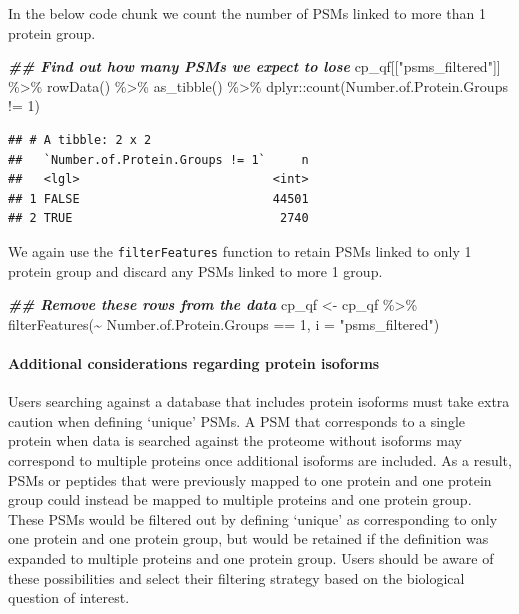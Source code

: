 \documentclass[9pt,a4paper,]{extarticle}
\newenvironment{Shaded}{\begin{snugshade}}{\end{snugshade}}
\newcommand{\AttributeTok}[1]{\textcolor[rgb]{0.77,0.63,0.00}{#1}}
\newcommand{\DecValTok}[1]{\textcolor[rgb]{0.00,0.00,0.81}{#1}}
\newcommand{\DocumentationTok}[1]{\textcolor[rgb]{0.56,0.35,0.01}{\textbf{\textit{#1}}}}
\newcommand{\FunctionTok}[1]{\textcolor[rgb]{0.00,0.00,0.00}{#1}}
\newcommand{\NormalTok}[1]{#1}
\newcommand{\OtherTok}[1]{\textcolor[rgb]{0.56,0.35,0.01}{#1}}
\newcommand{\SpecialCharTok}[1]{\textcolor[rgb]{0.00,0.00,0.00}{#1}}
\newcommand{\StringTok}[1]{\textcolor[rgb]{0.31,0.60,0.02}{#1}}
\begin{document}
In the below code chunk we count the number of PSMs linked to more than 1
protein group.

\begin{Shaded}
\begin{Highlighting}[]
\DocumentationTok{\#\# Find out how many PSMs we expect to lose}
\NormalTok{cp\_qf[[}\StringTok{"psms\_filtered"}\NormalTok{]] }\SpecialCharTok{\%\textgreater{}\%} 
  \FunctionTok{rowData}\NormalTok{() }\SpecialCharTok{\%\textgreater{}\%} 
  \FunctionTok{as\_tibble}\NormalTok{() }\SpecialCharTok{\%\textgreater{}\%} 
\NormalTok{  dplyr}\SpecialCharTok{::}\FunctionTok{count}\NormalTok{(Number.of.Protein.Groups }\SpecialCharTok{!=} \DecValTok{1}\NormalTok{)}
\end{Highlighting}
\end{Shaded}

\begin{verbatim}
## # A tibble: 2 x 2
##   `Number.of.Protein.Groups != 1`     n
##   <lgl>                           <int>
## 1 FALSE                           44501
## 2 TRUE                             2740
\end{verbatim}

We again use the \texttt{filterFeatures} function to retain PSMs linked to only
1 protein group and discard any PSMs linked to more 1 group.

\begin{Shaded}
\begin{Highlighting}[]
\DocumentationTok{\#\# Remove these rows from the data}
\NormalTok{cp\_qf }\OtherTok{\textless{}{-}}\NormalTok{ cp\_qf }\SpecialCharTok{\%\textgreater{}\%}
  \FunctionTok{filterFeatures}\NormalTok{(}\SpecialCharTok{\textasciitilde{}}\NormalTok{ Number.of.Protein.Groups }\SpecialCharTok{==} \DecValTok{1}\NormalTok{, }
                 \AttributeTok{i =} \StringTok{"psms\_filtered"}\NormalTok{)}
\end{Highlighting}
\end{Shaded}

\hypertarget{additional-considerations-regarding-protein-isoforms}{%
\paragraph{Additional considerations regarding protein isoforms}\label{additional-considerations-regarding-protein-isoforms}}

Users searching against a database that includes protein isoforms must take
extra caution when defining `unique' PSMs. A PSM that corresponds to a single
protein when data is searched against the proteome without isoforms may
correspond to multiple proteins once additional isoforms are included. As a
result, PSMs or peptides that were previously mapped to one protein and one
protein group could instead be mapped to multiple proteins and one protein group.
These PSMs would be filtered out by defining `unique' as corresponding to only
one protein and one protein group, but would be retained if the definition was
expanded to multiple proteins and one protein group. Users should be aware of
these possibilities and select their filtering strategy based on the biological
question of interest.
\end{document}
